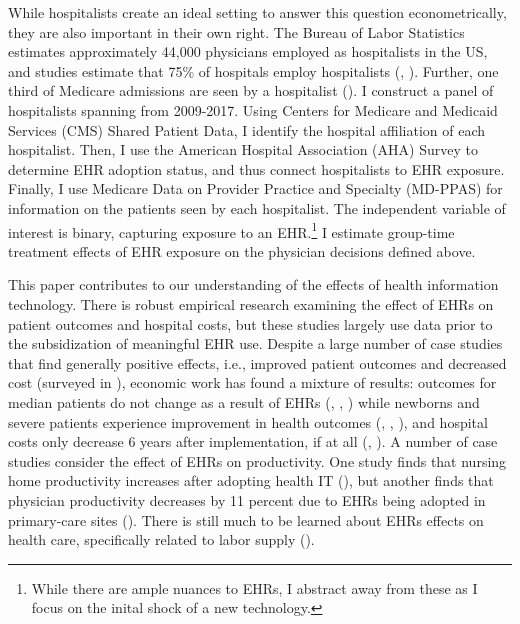 \documentclass[12pt]{article}
\begin{document}
While hospitalists create an ideal setting to answer this question econometrically, they are also important in their own right. The Bureau of Labor Statistics estimates approximately 44,000 physicians employed as hospitalists in the US, and studies estimate that 75\% of hospitals employ hospitalists (\cite{bls}, \cite{healthecareers_2022}). Further, one third of Medicare admissions are seen by a hospitalist (\cite{messler2015history}). I construct a panel of hospitalists spanning from 2009-2017. Using Centers for Medicare and Medicaid Services (CMS) Shared Patient Data, I identify the hospital affiliation of each hospitalist. Then, I use the American Hospital Association (AHA) Survey to determine EHR adoption status, and thus connect hospitalists to EHR exposure. Finally, I use Medicare Data on Provider Practice and Specialty (MD-PPAS) for information on the patients seen by each hospitalist. The independent variable of interest is binary, capturing exposure to an EHR.\footnote{While there are ample nuances to EHRs, I abstract away from these as I focus on the inital shock of a new technology.} I estimate group-time treatment effects of EHR exposure on the physician decisions defined above.

This paper contributes to our understanding of the effects of health information technology. There is robust empirical research examining the effect of EHRs on patient outcomes and hospital costs, but these studies largely use data prior to the subsidization of meaningful EHR use. Despite a large number of case studies that find generally positive effects, i.e., improved patient outcomes and decreased cost (surveyed in \cite{Buntin2011TheResults}), economic work has found a mixture of results: outcomes for median patients do not change as a result of EHRs (\cite{Agha2014TheCare}, \cite{McCullough2016HealthCoordination}, \cite{Meyerhoefer}) while newborns and severe patients experience improvement in health outcomes (\cite{Miller2009}, \cite{Freedman2015}, \cite{McCullough2016HealthCoordination}), and hospital costs only decrease 6 years after implementation, if at all (\cite{Agha2014TheCare}, \cite{dranove2014trillion}). A number of case studies consider the effect of EHRs on productivity. One study finds that nursing home productivity increases after adopting health IT (\cite{Hitt2016}), but another finds that physician productivity decreases by 11 percent due to EHRs being adopted in primary-care sites (\cite{Meyerhoefer}). There is still much to be learned about EHRs effects on health care, specifically related to labor supply (\cite{NBERw29218}). 
\end{document}
